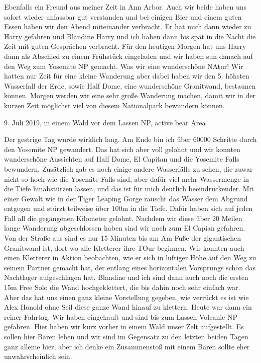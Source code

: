 \documentclass[11pt]{book}
\begin{document}
Ebenfalls ein Freund aus meiner Zeit in Ann Arbor. Auch wir beide haben uns sofort wieder unfassbar gut verstanden und bei einigen Bier und einem guten 
Essen haben wir den Abend miteinander verbracht. Er hat mich dann wieder zu Harry gefahren und Blandine Harry und ich haben dann bis spät in die Nacht 
die Zeit mit guten Gesprächen verbracht. Für den heutigen Morgen hat uns Harry dann als Abschied zu einem Frühstück eingeladen und wir haben sun danach 
auf den Weg zum Yosemite NP gemacht. Was wir eine wunderschöne NAtur! Wir hatten nur Zeit für eine kleine Wanderung aber dabei haben wir den 5. höhsten 
Wasserfall der Erde, sowie Half Dome, eine wunderschöne Granitwand, bestaunen können. Morgen werden wir eine sehr große Wanderung machen, damit wir 
in der kurzen Zeit möglichst viel von diesem Nationalpark bewundern können. 



9. Juli 2019, in einem Wald vor dem Lassen NP, active bear Area

Der gestrige Tag wurde wirklich lang. Am Ende bin ich über 60000 Schritte durch den Yosemite NP gewandert. Das hat sich aber voll gelohnt und wir konnten 
wunderschöne Aussichten auf Half Dome, El Capitan und die Yosemite Falls bewundern. Zusätzlich gab es noch einige andere Wasserfälle zu sehen, die zuwar 
nicht so hoch wie die Yosemite Falls sind, aber dafür viel mehr Wassermenge in die Tiefe hinabstürzen lassen, und das ist für mich deutlich beeindruckender. 
Mit einer Gewalt wie in der Tiger Leaping Gorge rauscht das Wasser dem Abgrund entgegen und stürzt teilweise über 100m in die Tiefe. Dafür haben sich auf 
jeden Fall all die gegangenen Kilometer gelohnt. Nachdem wir diese über 20 Meilen lange Wanderung abgeschlossen haben sind wir noch zum El Capian gefahren. 
Von der Straße aus sind es nur 15 Minuten bis am Am Fuße der gigantischen Granitwand ist, dort wo alle Kletterer ihre TOur beginnen. Wir konnten auch 
einen Kletterer in Aktion beobachten, wie er sich in luftiger Höhe auf den Weg zu seinem Partner gemacht hat, der entlang eines horizontalen Vorsprungs schon 
das Nachtlager aufgeschlagen hat. Blandine und ich sind dann auch noch die ersten 15m Free Solo die Wand hochgeklettert, die bis dahin noch sehr einfach 
war. Aber das hat uns einen ganz kleine Vorstellung gegeben, wie verrückt es ist wie Alex Honold ohne Seil diese ganze Wand hinauf zu klettern. 
Heute war dann ein reiner Fahrtag. Wir haben eingekauft und sind bis zum Lassen Volcanic NP gefahren. Hier haben wir kurz vorher in einem Wald unser 
Zelt aufgestellt. Es sollen hier Bären leben und wir sind im Gegensatz zu den letzten beiden Tagen ganz alleine hier, aber ich denke ein Zusammenstoß 
mit einem Bären sollte eher unwahrscheinlich sein. 
\end{document}
